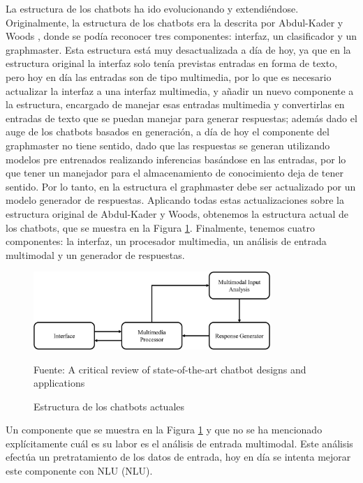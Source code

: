 La estructura de los chatbots ha ido evolucionando y extendiéndose. Originalmente, la estructura de los chatbots era la descrita por Abdul-Kader y Woods \cite{RefWorks:RefID:36-luo2022critical}, donde se podía reconocer tres componentes: interfaz, un clasificador y un graphmaster. Esta estructura está muy desactualizada a día de hoy, ya que en la estructura original la interfaz solo tenía previstas entradas en forma de texto, pero hoy en día las entradas son de tipo multimedia, por lo que es necesario actualizar la interfaz a una interfaz multimedia, y añadir un nuevo componente a la estructura, encargado de manejar esas entradas multimedia y convertirlas en entradas de texto que se puedan manejar para generar respuestas; además dado el auge de los chatbots basados en generación, a día de hoy el componente del graphmaster no tiene sentido, dado que las respuestas se generan utilizando modelos pre entrenados realizando inferencias basándose en las entradas, por lo que tener un manejador para el almacenamiento de conocimiento deja de tener sentido. Por lo tanto, en la estructura el graphmaster debe ser actualizado por un modelo generador de respuestas. Aplicando todas estas actualizaciones sobre la estructura original de Abdul-Kader y Woods, obtenemos la estructura actual de los chatbots, que se muestra en la Figura \ref{fig:estructura_state_of_art}. Finalmente, tenemos cuatro componentes: la interfaz, un procesador multimedia, un análisis de entrada multimodal y un generador de respuestas.

\begin{figure}[h]
\centering
\includegraphics[width=0.8\textwidth]{imagenes/02_EstadoDelArte/estructura_state_of_art.jpg}
\begin{center}
Fuente: A critical review of state-of-the-art chatbot designs and applications \cite{RefWorks:RefID:36-luo2022critical}
\end{center}
\caption{Estructura de los chatbots actuales}
\label{fig:estructura_state_of_art}
\end{figure}

Un componente que se muestra en la Figura \ref{fig:estructura_state_of_art} y que no se ha mencionado explícitamente cuál es su labor es el análisis de entrada multimodal. Este análisis efectúa un pretratamiento de los datos de entrada, hoy en día se intenta mejorar este componente con \gls{NLU} (NLU).

